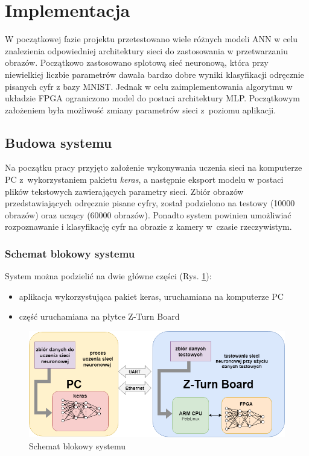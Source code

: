 \newpage %
\cleardoublepage %
\pagestyle{headings}

\section{Implementacja}
W początkowej fazie projektu przetestowano wiele różnych modeli ANN w celu znalezienia odpowiedniej architektury sieci do zastosowania w przetwarzaniu obrazów. Początkowo zastosowano splotową sieć neuronową, która przy niewielkiej liczbie parametrów dawała bardzo dobre wyniki klasyfikacji odręcznie pisanych cyfr z bazy MNIST. Jednak w celu zaimplementowania algorytmu w układzie FPGA ograniczono model do postaci architektury MLP. Początkowym założeniem była możliwość zmiany parametrów sieci z~poziomu aplikacji.

\subsection{Budowa systemu}

Na początku pracy przyjęto założenie wykonywania uczenia sieci na komputerze PC z~wykorzystaniem pakietu \emph{keras}, a następnie eksport modelu w postaci plików tekstowych zawierających parametry sieci. Zbiór obrazów przedstawiających odręcznie pisane cyfry, został podzielono na testowy (10000 obrazów) oraz uczący (60000 obrazów). Ponadto system powinien umożliwiać rozpoznawanie i klasyfikację cyfr na obrazie z kamery w~czasie rzeczywistym.

\subsubsection{Schemat blokowy systemu}

System można podzielić na dwie główne części (Rys. \ref{schemat_blokowy}):
\begin{itemize}
  \item aplikacja wykorzystująca pakiet keras, uruchamiana na komputerze PC
  \item część uruchamiana na płytce Z-Turn Board
\end{itemize}

\begin{figure}[!h]
  \centering
  \includegraphics[width=\textwidth]{img/schemat_blokowy.png}
  \caption{Schemat blokowy systemu}
  \label{schemat_blokowy}
\end{figure}

